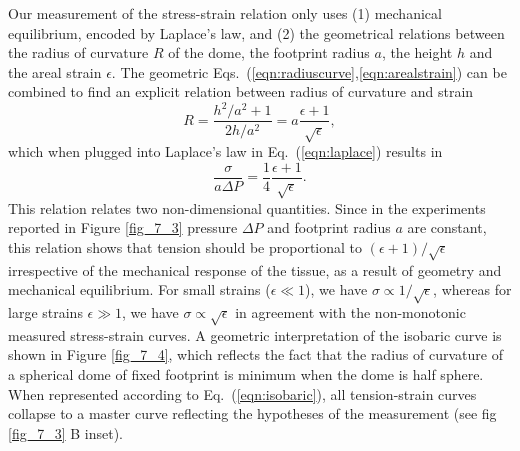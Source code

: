 Our measurement of the stress-strain relation only uses (1) mechanical equilibrium, encoded by Laplace's law, and (2) the geometrical relations between the radius of curvature $R$ of the dome, the footprint radius $a$, the height $h$ and the areal strain $\epsilon$. The geometric Eqs.~(\ref{eqn:radiuscurve},\ref{eqn:arealstrain}) can be combined to find an explicit relation between radius of curvature and strain
\begin{equation}
	R = \frac{h^2/a^2 + 1}{2h/a^2} = a\frac{\epsilon + 1}{\sqrt{\epsilon}},
\end{equation}
which when plugged into Laplace's law in Eq.~(\ref{eqn:laplace}) results in 
\begin{equation}
	\label{eqn:isobaric}
	\frac{\sigma}{a \Delta P} = \frac{1}{4}  \frac{\epsilon + 1}{\sqrt{\epsilon}}.
\end{equation}
This relation relates two non-dimensional quantities. Since in the experiments reported in Figure \ref{fig_7_3} pressure $\Delta P$ and footprint radius $a$ are constant, this relation shows that tension should be proportional to $(\epsilon + 1)/\sqrt{\epsilon}$ irrespective of the mechanical response of the tissue, as a result of geometry and mechanical equilibrium. For small strains ($\epsilon\ll 1$), we have $\sigma \propto 1/\sqrt{\epsilon}$, whereas for large strains $\epsilon\gg 1$, we have $\sigma \propto \sqrt{\epsilon}$ in agreement with the non-monotonic measured stress-strain curves. A geometric interpretation of the isobaric curve is shown in Figure \ref{fig_7_4}, which reflects the fact that the radius of curvature of a spherical dome of fixed footprint is minimum when the dome is half sphere. When represented according to Eq.~(\ref{eqn:isobaric}), all tension-strain curves collapse to a master curve reflecting the hypotheses of the measurement (see fig \ref{fig_7_3} B inset).





